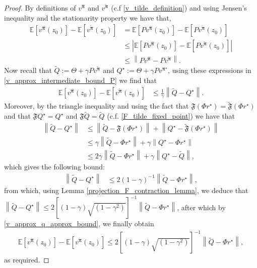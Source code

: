 \documentclass{article}
\begin{document}
\begin{proof}

By definitions of $v^{\boldsymbol{\hat{\pi}}}$ and $v^{\boldsymbol{\tilde{\pi}}}$ (c.f \eqref{v_tilde_definition}) and using Jensen's inequality and the stationarity property we have that,
\begin{align}\nonumber
    \mathbb{E}\left[v^{\boldsymbol{\hat{\pi}}}(z_0)\right]-\mathbb{E}\left[v^{\boldsymbol{\tilde{\pi}}}(z_0)\right]&=\mathbb{E}\left[Pv^{\boldsymbol{\hat{\pi}}}(z_0)\right]-\mathbb{E}\left[Pv^{\boldsymbol{\tilde{\pi}}}(z_0)\right]
    \\&\leq \left|\mathbb{E}\left[Pv^{\boldsymbol{\hat{\pi}}}(z_0)\right]-\mathbb{E}\left[Pv^{\boldsymbol{\tilde{\pi}}}(z_0)\right]\right|\nonumber
    \\&\leq \left\|Pv^{\boldsymbol{\hat{\pi}}}-Pv^{\boldsymbol{\tilde{\pi}}}\right\|. \label{v_approx_intermediate_bound_P}
\end{align}
Now recall that $\tilde{Q}:=\Theta+\gamma Pv^{\boldsymbol{\tilde{\pi}}}$ and $Q^\star:=\Theta+\gamma Pv^{\boldsymbol{\pi^\star}}$,  using these expressions in \eqref{v_approx_intermediate_bound_P} we find that 
\begin{align*}
    \mathbb{E}\left[v^{\boldsymbol{\hat{\pi}}}(z_0)\right]-\mathbb{E}\left[v^{\boldsymbol{\tilde{\pi}}}(z_0)\right]&\leq \frac{1}{\gamma}\left\|\tilde{Q}-Q^\star\right\|. \label{v_approx_q_approx_bound}
\end{align*}
Moreover, by the triangle inequality and using the fact that $\mathfrak{F}(\Phi r^\star)=\tilde{\mathfrak{F}}(\Phi r^\star)$ and that $\mathfrak{F}Q^\star=Q^\star$ and $\mathfrak{F}\tilde{Q}=\tilde{Q}$ (c.f. \eqref{F_tilde_fixed_point}) we have that
\begin{align*}
\left\|\tilde{Q}-Q^\star\right\|&\leq \left\|\tilde{Q}-\mathfrak{F}(\Phi r^\star)\right\|+\left\|Q^\star-\tilde{\mathfrak{F}}(\Phi r^\star)\right\|    
\\&\leq \gamma\left\|\tilde{Q}-\Phi r^\star\right\|+\gamma\left\|Q^\star-\Phi r^\star\right\| 
\\&\leq 2\gamma\left\|\tilde{Q}-\Phi r^\star\right\|+\gamma\left\|Q^\star-\tilde{Q}\right\|, 
\end{align*}
which gives the following bound:
\begin{align*}
\left\|\tilde{Q}-Q^\star\right\|&\leq 2\left(1-\gamma\right)^{-1}\left\|\tilde{Q}-\Phi r^\star\right\|, 
\end{align*}
from which, using Lemma \ref{projection_F_contraction_lemma}, we deduce that $
    \left\|\tilde{Q}-Q^\star\right\|\leq 2\left[(1-\gamma)\sqrt{(1-\gamma^2)}\right]^{-1}\left\|\tilde{Q}-\Phi r^\star\right\|$,
after which by \eqref{v_approx_q_approx_bound}, we finally obtain
\begin{align*}
        \mathbb{E}\left[v^{\boldsymbol{\hat{\pi}}}(z_0)\right]-\mathbb{E}\left[v^{\boldsymbol{\tilde{\pi}}}(z_0)\right]\leq  2\left[(1-\gamma)\sqrt{(1-\gamma^2)}\right]^{-1}\left\|\tilde{Q}-\Phi r^\star\right\|,
\end{align*}
as required.
\end{proof}
\end{document}

